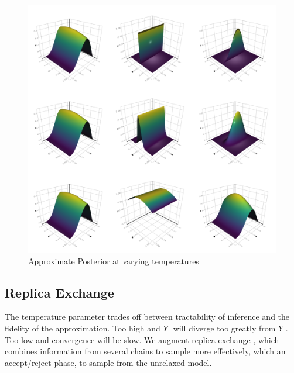 \begin{figure}\label{temppost}
\includegraphics[width=\linewidth]{approxpost.png}
\caption{Approximate Posterior at varying temperatures}
\end{figure}



\subsection{Replica Exchange}\label{replicaexchange}

The temperature parameter trades off between tractability of inference and the fidelity of the approximation.
Too high and $\tilde{Y}$ will diverge too greatly from $Y$   . Too low and convergence will be slow.
We augment replica exchange \citep{swendsen1986replica}, which combines information from several chains to sample more effectively, which an accept/reject phase, to sample from the unrelaxed model.


